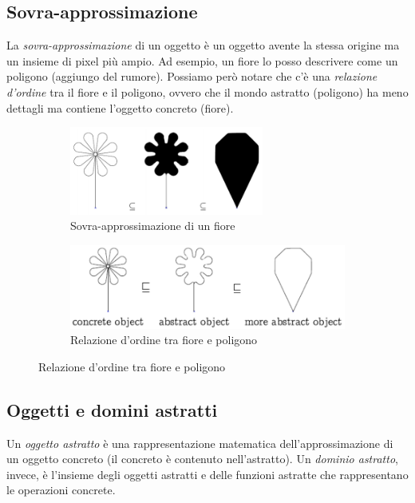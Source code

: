 \documentclass[a4paper,oneside,titlepage]{book}
\begin{document}
\subsection{Sovra-approssimazione}
La \textit{sovra-approssimazione} di un oggetto è un oggetto avente la stessa origine ma un insieme di pixel più ampio. Ad esempio, un fiore lo posso descrivere come un poligono (aggiungo del rumore). Possiamo però notare che c'è una \textit{relazione d'ordine} tra il fiore e il poligono, ovvero che il mondo astratto (poligono) ha meno dettagli ma contiene l'oggetto concreto (fiore).
\begin{figure}[htp]
	\begin{subfigure}{0.49\textwidth}
	    \centering
		\includegraphics[width=0.7\textwidth]{uppApp1.png}
		\caption{Sovra-approssimazione di un fiore}
	\end{subfigure}
	\hfill
	\begin{subfigure}{0.49\textwidth}
	    \centering
		\includegraphics[width=\textwidth, height=\textheight, keepaspectratio]{uppApp2.png} 
		\caption{Relazione d'ordine tra fiore e poligono}
	\end{subfigure}
\end{figure}

\subsection{Oggetti e domini astratti}
Un \textit{oggetto astratto} è una rappresentazione matematica dell'approssimazione di un oggetto concreto (il concreto è contenuto nell'astratto). Un \textit{dominio astratto}, invece, è l'insieme degli oggetti astratti e delle funzioni astratte che rappresentano le operazioni concrete.
\end{document}
